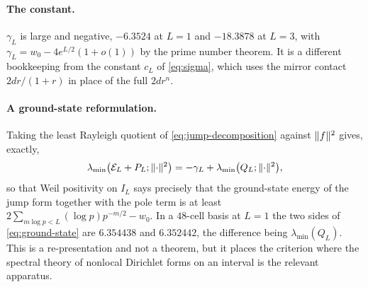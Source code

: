 \paragraph{The constant.} $\gamma_L$ is large and negative, $-6.3524$ at $L=1$
and $-18.3878$ at $L=3$, with $\gamma_L=w_0-4e^{L/2}(1+o(1))$ by the prime number
theorem. It is a different bookkeeping from the constant $c_L$ of
\eqref{eq:sigma}, which uses the mirror contact $2dr/(1+r)$ in place of the full
$2dr^n$.

\paragraph{A ground-state reformulation.} Taking the least Rayleigh quotient of
\eqref{eq:jump-decomposition} against $\lVert f\rVert^2$ gives, exactly,
\begin{equation}\label{eq:ground-state}
 \lambda_{\min}\big(\mathcal E_L+P_L;\lVert \cdot\rVert^2\big)
 =-\gamma_L+\lambda_{\min}\big(Q_L;\lVert \cdot\rVert^2\big),
\end{equation}
so that Weil positivity on $I_L$ says precisely that the ground-state energy of
the jump form together with the pole term is at least
$2\sum_{m\log p<L}(\log p)p^{-m/2}-w_0$. In a $48$-cell basis at $L=1$ the two
sides of \eqref{eq:ground-state} are $6.354438$ and $6.352442$, the difference
being $\lambda_{\min}(Q_L)$. This is a re-presentation and not a theorem, but it
places the criterion where the spectral theory of nonlocal Dirichlet forms on an
interval is the relevant apparatus.
